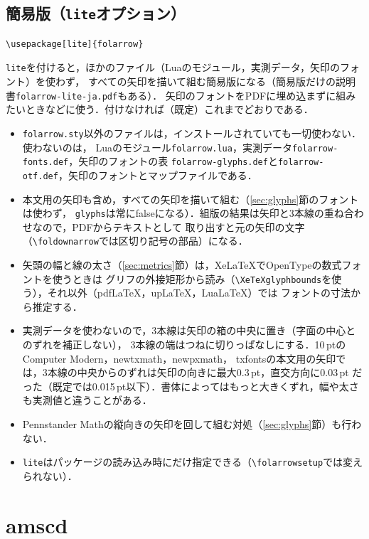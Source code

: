 \documentclass[dvipdfmx,paper=a4]{jlreq}
\newcommand\pkg[1]{\textsf{#1}}
\newcommand\file[1]{\texttt{#1}}
\begin{document}
\subsection{簡易版（\texttt{lite}オプション）}\label{sec:lite}
\begin{Verbatim}
\usepackage[lite]{folarrow}
\end{Verbatim}
\verb|lite|を付けると，ほかのファイル（Luaのモジュール，実測データ，矢印のフォント）を使わず，
すべての矢印を描いて組む簡易版になる（簡易版だけの説明書\file{folarrow-lite-ja.pdf}もある）．
矢印のフォントをPDFに埋め込まずに組みたいときなどに使う．付けなければ（既定）これまでどおりである．
\begin{itemize}
\item \file{folarrow.sty}以外のファイルは，インストールされていても一切使わない．使わないのは，
  Luaのモジュール\file{folarrow.lua}，実測データ\file{folarrow-fonts.def}，矢印のフォントの表
  \file{folarrow-glyphs.def}と\file{folarrow-otf.def}，矢印のフォントとマップファイルである．
\item 本文用の矢印も含め，すべての矢印を描いて組む（\ref{sec:glyphs}節のフォントは使わず，
  \verb|glyphs|は常にfalseになる）．組版の結果は矢印と3本線の重ね合わせなので，PDFからテキストとして
  取り出すと元の矢印の文字（\verb|\foldownarrow|では区切り記号の部品）になる．
\item 矢頭の幅と線の太さ（\ref{sec:metrics}節）は，Xe\LaTeX{}でOpenTypeの数式フォントを使うときは
  グリフの外接矩形から読み（\verb|\XeTeXglyphbounds|を使う），それ以外（pdf\LaTeX，up\LaTeX，Lua\LaTeX{}）では
  フォントの寸法から推定する．
\item 実測データを使わないので，3本線は矢印の箱の中央に置き（字面の中心とのずれを補正しない），
  3本線の端はつねに切りっぱなしにする．10\,ptのComputer Modern，\pkg{newtxmath}，\pkg{newpxmath}，
  \pkg{txfonts}の本文用の矢印では，3本線の中央からのずれは矢印の向きに最大0.3\,pt，直交方向に0.03\,pt
  だった（既定では0.015\,pt以下）．書体によってはもっと大きくずれ，幅や太さも実測値と違うことがある．
\item Pennstander Mathの縦向きの矢印を回して組む対処（\ref{sec:glyphs}節）も行わない．
\item \verb|lite|はパッケージの読み込み時にだけ指定できる（\verb|\folarrowsetup|では変えられない）．
\end{itemize}

\section{amscd}
\end{document}
